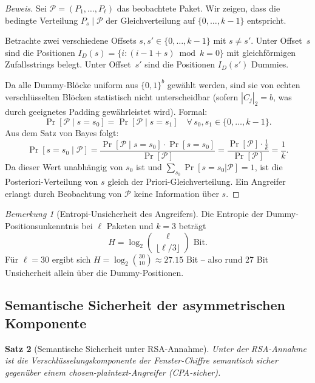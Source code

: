﻿\documentclass[12pt, a4paper]{article}
\theoremstyle{plain}
\newtheorem{theorem}{Satz}[section]
\theoremstyle{definition}
\theoremstyle{remark}
\newtheorem{remark}[theorem]{Bemerkung}
\newenvironment{myproof}[1][Beweis]{%
  \begin{proof}[#1]
}{%
  \end{proof}
}
\begin{document}
\begin{myproof}
  Sei $\mathcal{P} = (P_1,\ldots,P_\ell)$ das beobachtete Paket.
  Wir zeigen, dass die bedingte Verteilung $P_s \mid \mathcal{P}$
  der Gleichverteilung auf $\{0,\ldots,k-1\}$ entspricht.

  \medskip\noindent
  Betrachte zwei verschiedene Offsets $s, s' \in \{0,\ldots,k-1\}$ mit $s \neq s'$.
  Unter Offset~$s$ sind die Positionen $I_D(s) = \{i : (i-1+s)\bmod k = 0\}$
  mit gleichf\"ormigen Zufallsstrings belegt.
  Unter Offset~$s'$ sind die Positionen $I_D(s')$ Dummies.

  Da alle Dummy-Bl\"ocke uniform aus $\{0,1\}^b$ gew\"ahlt werden,
  sind sie von echten verschl\"usselten Bl\"ocken statistisch
  nicht unterscheidbar (sofern $|C_j|_2 = b$, was durch geeignetes
  Padding gew\"ahrleistet wird). Formal:
  \[
    \Pr[\mathcal{P} \mid s=s_0] = \Pr[\mathcal{P} \mid s=s_1]
    \quad\forall\, s_0, s_1 \in \{0,\ldots,k-1\}.
  \]
  Aus dem Satz von Bayes folgt:
  \[
    \Pr[s = s_0 \mid \mathcal{P}]
    = \frac{\Pr[\mathcal{P} \mid s=s_0]\cdot\Pr[s=s_0]}{\Pr[\mathcal{P}]}
    = \frac{\Pr[\mathcal{P}] \cdot \frac{1}{k}}{\Pr[\mathcal{P}]} = \frac{1}{k}.
  \]
  Da dieser Wert unabh\"angig von $s_0$ ist und $\sum_{s_0} \Pr[s=s_0|\mathcal{P}]=1$,
  ist die Posteriori-Verteilung von $s$ gleich der Priori-Gleichverteilung.
  Ein Angreifer erlangt durch Beobachtung von $\mathcal{P}$ keine
  Information \"uber $s$. 
\end{myproof}

\begin{remark}[Entropi-Unsicherheit des Angreifers]\label{rem:entropie}
  Die Entropie der Dummy-Positions\-unkenntnis bei $\ell$ Paketen
  und $k=3$ betr\"agt
  \[
    H = \log_2 \binom{\ell}{\lfloor\ell/3\rfloor} \text{ Bit}.
  \]
  F\"ur $\ell = 30$ ergibt sich $H = \log_2 \binom{30}{10} \approx 27.15$ Bit --
  also rund 27 Bit Unsicherheit allein \"uber die Dummy-Positionen.
\end{remark}

\subsection{Semantische Sicherheit der asymmetrischen Komponente}

\begin{theorem}[Semantische Sicherheit unter RSA-Annahme]\label{thm:sem_sicher}
  Unter der RSA-Annahme ist die Verschl\"usselungskomponente der
  Fenster-Chiffre semantisch sicher gegen\"uber einem
  chosen-plaintext-Angreifer (CPA-sicher).
\end{theorem}
\end{document}
